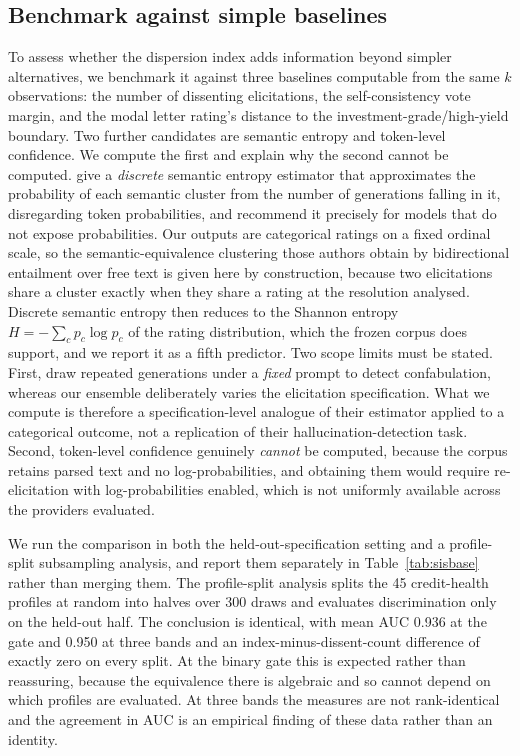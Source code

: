 \documentclass[a4paper,fleqn]{cas-sc}
\begin{document}
\subsection{Benchmark against simple baselines}\label{sec:sis-baselines}
To assess whether the dispersion index adds information beyond simpler alternatives, we benchmark
it against three baselines computable from the same $k$ observations: the number of dissenting
elicitations, the self-consistency vote margin, and the modal letter rating's distance to the
investment-grade/high-yield boundary. Two further candidates are semantic entropy and token-level confidence. We compute the first and explain why the second cannot be computed. \citet{farquhar2024semantic} give a \emph{discrete} semantic
entropy estimator that approximates the probability of each semantic cluster from the number of
generations falling in it, disregarding token probabilities, and recommend it precisely for models
that do not expose probabilities. Our outputs are categorical ratings on a fixed ordinal scale, so
the semantic-equivalence clustering those authors obtain by bidirectional entailment over free text
is given here by construction, because two elicitations share a cluster exactly when they share a rating at
the resolution analysed. Discrete semantic entropy then reduces to the Shannon entropy
$H=-\sum_c p_c\log p_c$ of the rating distribution, which the frozen corpus does support, and we
report it as a fifth predictor. Two scope limits must be stated. First,
\citet{farquhar2024semantic} draw repeated generations under a \emph{fixed} prompt to detect
confabulation, whereas our ensemble deliberately varies the elicitation specification. What we
compute is therefore a specification-level analogue of their estimator applied to a categorical
outcome, not a replication of their hallucination-detection task. Second, token-level confidence
genuinely \emph{cannot} be computed, because the corpus retains parsed text and no log-probabilities, and
obtaining them would require re-elicitation with log-probabilities enabled, which is not uniformly
available across the providers evaluated.

We run the comparison in both the held-out-specification setting and a profile-split subsampling analysis, and report them separately in Table~\ref{tab:sisbase} rather than merging
them. The profile-split analysis splits the 45 credit-health profiles at random into
halves over 300 draws and evaluates discrimination only on the held-out half. The conclusion is identical, with mean AUC
0.936 at the gate and 0.950 at three bands and an index-minus-dissent-count difference of exactly
zero on every split. At the binary gate this is expected rather than reassuring, because the equivalence there is
algebraic and so cannot depend on which profiles are evaluated. At three bands the measures are not
rank-identical and the agreement in AUC is an empirical finding of these data rather than an
identity.
\end{document}
